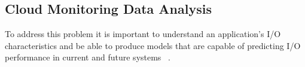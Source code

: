 \subsection{Cloud Monitoring Data Analysis}


To address this problem it is important to understand an application’s I/O characteristics and be able to produce models that are capable of predicting I/O performance in current and future systems ~\cite{Shan2008}.